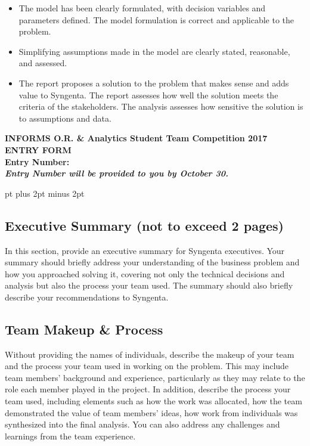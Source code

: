 \documentclass[11pt]{article} %
\begin{document}
{\begin{itemize}
\item The model has been clearly formulated, with decision variables and parameters defined. The model formulation is correct and applicable to the problem.

\item Simplifying assumptions made in the model are clearly stated, reasonable, and assessed.

\item The report proposes a solution to the problem that makes sense and adds value to Syngenta. The report assesses how well the solution meets the criteria of the stakeholders. The analysis assesses how sensitive the solution is to assumptions and data. 

\end{itemize}

}

\vfill\eject

\begin{centering}
\LARGE\bf
INFORMS O.R. \& Analytics Student Team Competition 2017\\
ENTRY FORM\\[10pt]
{\Large\bf Entry Number:}\\[-5pt]
{\normalsize\it Entry Number will be provided to you by October 30.}\\
\end{centering}

\begingroup
{} pt plus 2pt minus 2pt

\subsection*{Executive Summary (not to exceed 2 pages)}

In this section, provide an executive summary for Syngenta executives. Your 
summary should briefly address your understanding of the business problem 
and how you approached solving it, covering not only the technical decisions 
and analysis but also the process your team used. The summary should also 
briefly describe your recommendations to Syngenta.

\subsection*{Team Makeup \& Process}

Without providing the names of individuals, describe the makeup of your team 
and the process your team used in working on the problem. This may include 
team members' background and experience, particularly as they may relate to 
the role each member played in the project. In addition, describe the 
process your team used, including elements such as how the work was 
allocated, how the team demonstrated the value of team members' ideas, how 
work from individuals was synthesized into the final analysis. You can also 
address any challenges and learnings from the team experience. 
\end{document}
